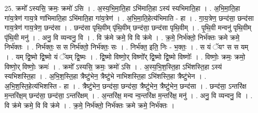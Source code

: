 \documentclass[17pt]{extarticle}
\begin{document}
25. क्रमो᳚ ऽस्यसि॒ क्रमः॒ क्रमो॑ ऽसि । . अ॒स्य॒भि॒मा॒ति॒हा ऽभि॑माति॒हा ऽस्य॑ स्यभिमाति॒हा । . अ॒भि॒मा॒ति॒हा गा॑य॒त्रेण॑ गाय॒त्रे णा॑भिमाति॒हा ऽभि॑माति॒हा गा॑य॒त्रेण॑ । . अ॒भि॒मा॒ति॒हेत्य॑भिमाति - हा । . गा॒य॒त्रेण॒ छन्द॑सा॒ छन्द॑सा गाय॒त्रेण॑ गाय॒त्रेण॒ छन्द॑सा । . छन्द॑सा पृथि॒वीम् पृ॑थि॒वीम् छन्द॑सा॒ छन्द॑सा पृथि॒वीम् । . पृ॒थि॒वी मन्वनु॑ पृथि॒वीम् पृ॑थि॒वी मनु॑ । . अनु॒ वि व्यन्वनु॒ वि । . वि क्र॑मे क्रमे॒ वि वि क्र॑मे । . क्र॒मे॒ निर्भ॑क्तो॒ निर्भ॑क्तः क्रमे क्रमे॒ निर्भ॑क्तः । . निर्भ॑क्तः॒ स स निर्भ॑क्तो॒ निर्भ॑क्तः॒ सः । . निर्भ॑क्त॒ इति॒ निः - भ॒क्तः॒ । . स यं ॅयꣳ स स यम् । . यम् द्वि॒ष्मो द्वि॒ष्मो यं ॅयम् द्वि॒ष्मः । . द्वि॒ष्मो विष्णो॒र् विष्णो᳚र् द्वि॒ष्मो द्वि॒ष्मो विष्णोः᳚ । . विष्णोः॒ क्रमः॒ क्रमो॒ विष्णो॒र् विष्णोः॒ क्रमः॑ । . क्रमो᳚ ऽस्यसि॒ क्रमः॒ क्रमो॑ ऽसि । . अ॒स्य॒भि॒श॒स्ति॒हा ऽभि॑शस्ति॒हा ऽस्य॑ स्यभिशस्ति॒हा । . अ॒भि॒श॒स्ति॒हा त्रैष्टु॑भेन॒ त्रैष्टु॑भे नाभिशस्ति॒हा ऽभि॑शस्ति॒हा त्रैष्टु॑भेन । . अ॒भि॒श॒स्ति॒हेत्य॑भिशस्ति - हा । . त्रैष्टु॑भेन॒ छन्द॑सा॒ छन्द॑सा॒ त्रैष्टु॑भेन॒ त्रैष्टु॑भेन॒ छन्द॑सा । . छन्द॑सा॒ ऽन्तरि॑क्ष म॒न्तरि॑क्ष॒म् छन्द॑सा॒ छन्द॑सा॒ ऽन्तरि॑क्षम् । . अ॒न्तरि॑क्ष॒ मन्व न्व॒न्तरि॑क्ष म॒न्तरि॑क्ष॒ मनु॑ । . अनु॒ वि व्यन्वनु॒ वि । . वि क्र॑मे क्रमे॒ वि वि क्र॑मे । . क्र॒मे॒ निर्भ॑क्तो॒ निर्भ॑क्तः क्रमे क्रमे॒ निर्भ॑क्तः । \newline
\end{document}
